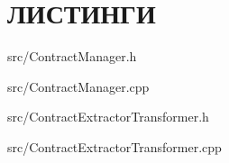 \chapter{ЛИСТИНГИ}
\label{app:results}

{src/ContractManager.h}


{src/ContractManager.cpp}


{src/ContractExtractorTransformer.h}


{src/ContractExtractorTransformer.cpp}